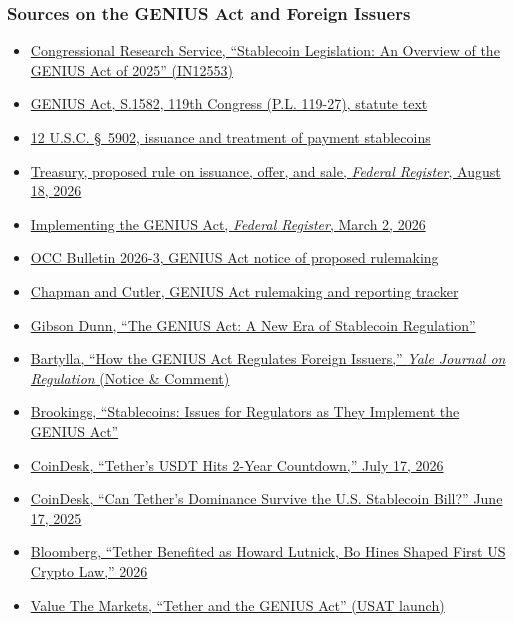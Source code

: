 \documentclass[aspectratio=169]{beamer}
\newcommand{\bi}{\begin{itemize}}
\newcommand{\ei}{\end{itemize}}
\newcommand{\m}{\item}
\begin{document}
\begin{frame}[label=appx-genius]
\frametitle{Sources on the GENIUS Act and Foreign Issuers}

{\scriptsize
\bi
\setlength{\itemsep}{0pt}
\m \href{https://www.congress.gov/crs-product/IN12553}{Congressional Research Service, ``Stablecoin Legislation: An Overview of the GENIUS Act of 2025'' (IN12553)}
\m \href{https://www.congress.gov/bill/119th-congress/senate-bill/1582/text}{GENIUS Act, S.1582, 119th Congress (P.L. 119-27), statute text}
\m \href{https://www.law.cornell.edu/uscode/text/12/5902}{12 U.S.C. \S~5902, issuance and treatment of payment stablecoins}
\m \href{https://www.federalregister.gov/documents/2026/08/18/2026-16796/genius-act-regulations-on-payment-stablecoin-issuance-offer-and-sale}{Treasury, proposed rule on issuance, offer, and sale, \emph{Federal Register}, August 18, 2026}
\m \href{https://www.federalregister.gov/documents/2026/03/02/2026-04089/implementing-the-guiding-and-establishing-national-innovation-for-us-stablecoins-act-for-the}{Implementing the GENIUS Act, \emph{Federal Register}, March 2, 2026}
\m \href{https://www.occ.gov/news-issuances/bulletins/2026/bulletin-2026-3.html}{OCC Bulletin 2026-3, GENIUS Act notice of proposed rulemaking}
\m \href{https://www.chapman.com/publication-genius-act-rulemaking-tracker}{Chapman and Cutler, GENIUS Act rulemaking and reporting tracker}
\m \href{https://www.gibsondunn.com/the-genius-act-a-new-era-of-stablecoin-regulation/}{Gibson Dunn, ``The GENIUS Act: A New Era of Stablecoin Regulation''}
\m \href{https://www.yalejreg.com/nc/how-the-genius-act-regulates-foreign-issuersand-how-it-compares-to-europe-and-the-uk-by-benedikt-bartylla/}{Bartylla, ``How the GENIUS Act Regulates Foreign Issuers,'' \emph{Yale Journal on Regulation} (Notice \& Comment)}
\m \href{https://www.brookings.edu/articles/stablecoins-issues-for-regulators-as-they-implement-genius-act/}{Brookings, ``Stablecoins: Issues for Regulators as They Implement the GENIUS Act''}
\m \href{https://www.coindesk.com/news-analysis/2026/07/17/tether-s-usdt-hits-2-year-countdown-threatening-its-position-on-u-s-crypto-platforms}{CoinDesk, ``Tether's USDT Hits 2-Year Countdown,'' July 17, 2026}
\m \href{https://www.coindesk.com/news-analysis/2025/06/17/can-tether-s-dominance-survive-the-u-s-stablecoin-bill}{CoinDesk, ``Can Tether's Dominance Survive the U.S. Stablecoin Bill?'' June 17, 2025}
\m \href{https://www.bloomberg.com/features/2026-howard-lutnick-bo-hines-trump-tether-crypto-law/}{Bloomberg, ``Tether Benefited as Howard Lutnick, Bo Hines Shaped First US Crypto Law,'' 2026}
\m \href{https://www.valuethemarkets.com/cryptocurrency/news/navigating-the-regulatory-landscape-tether-and-the-genius-act}{Value The Markets, ``Tether and the GENIUS Act'' (USAT launch)}
\ei
}

\par\vspace{0pt plus 1fill}\hfill{\scriptsize \hyperlink{main-stablecoin}{}}
\end{frame}
\end{document}
